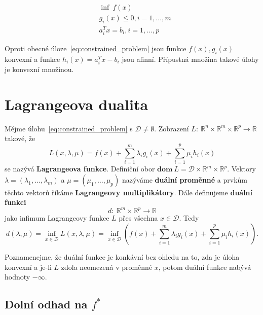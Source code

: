 \begin{equation}\label{eq:convex_problem}
    \begin{split}
        &\inf\ f(x) \\
        &g_i(x) \leq 0, i = 1, \dots, m \\
        &a_i^Tx = b_i, i = 1, \dots, p
    \end{split}
\end{equation}

Oproti obecné úloze~\ref{eq:constrained_problem} jsou funkce $f(x), g_i(x)$ konvexní a funkce $h_i(x) = a_i^Tx - b_i$ jsou afinní. Přípustná množina takové úlohy je konvexní množinou.

\section{Lagrangeova dualita}

Mějme úlohu~\ref{eq:constrained_problem} s $\mathcal{D} \neq \emptyset$. Zobrazení $L:\ \mathbb{R}^n \times \mathbb{R}^m \times \mathbb{R}^p \rightarrow \mathbb{R}$ takové, že
\begin{equation}
    L(x, \lambda, \mu) = f(x) + \sum_{i=1}^m \lambda_i g_i(x) + \sum_{i=1}^p \mu_i h_i(x)
\end{equation}
se nazývá \textbf{Lagrangeova funkce}. Definiční obor $\textbf{dom}\ L = \mathcal{D} \times \mathbb{R}^m \times \mathbb{R}^p$. Vektory $\lambda = (\lambda_1, \dots, \lambda_m)$ a $\mu = (\mu_1, \dots, \mu_p)$ nazýváme \textbf{duální proměnné} a prvkům těchto vektorů říkáme \textbf{Lagrangeovy multiplikátory}. Dále definujeme \textbf{duální funkci}
$$
    d:\ \mathbb{R}^m \times \mathbb{R}^p \rightarrow \mathbb{R}
$$
jako infimum Lagrangeovy funkce $L$ přes všechna $x \in \mathcal{D}$. Tedy
\begin{equation}
    d(\lambda, \mu) = \inf_{x \in \mathcal{D}} L(x, \lambda, \mu) = \inf_{x \in \mathcal{D}} \left( f(x) + \sum_{i=1}^m \lambda_i g_i(x) + \sum_{i=1}^p \mu_i h_i(x) \right).
\end{equation}

Poznamenejme, že duální funkce je konkávní bez ohledu na to, zda je úloha konvexní a je-li $L$ zdola neomezená v proměnné $x$, potom duální funkce nabývá hodnoty $-\infty$.

\subsection*{Dolní odhad na $f^*$}\label{s:lower_bound}

